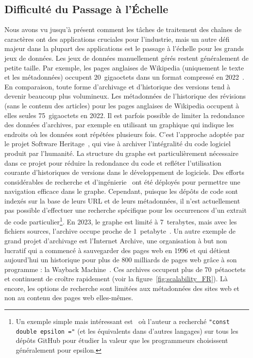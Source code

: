 \subsection*{Difficulté du Passage à l'Échelle}

Nous avons vu jusqu'à présent comment les tâches de traitement des chaînes de caractères ont des applications cruciales pour l'industrie, mais un autre défi majeur dans la plupart des applications est le passage à l'échelle pour les grands jeux de données.
Les jeux de données manuellement gérés restent généralement de petite taille. Par exemple, les pages anglaises de Wikipedia (uniquement le texte et les métadonnées) occupent 20~gigaoctets dans un format compressé en 2022~\cite{wikimedia}. En comparaison, toute forme d'archivage et d'historique des versions tend à devenir beaucoup plus volumineux. Les métadonnées de l'historique des révisions (sans le contenu des articles) pour les pages anglaises de Wikipedia occupent à elles seules 75~gigaoctets en 2022.
Il est parfois possible de limiter la redondance des données d'archives, par exemple en utilisant un graphique qui indique les endroits où les données sont répétées plusieurs fois. C'est l'approche adoptée par le projet Software Heritage~\cite{swh-site}, qui vise à archiver l'intégralité du code logiciel produit par l'humanité. La structure du graphe est particulièrement nécessaire dans ce projet pour réduire la redondance du code et refléter l'utilisation courante d'historiques de versions dans le développement de logiciels.
Des efforts considérables de recherche et d'ingénierie~\cite{DBLP:phd/hal/Pietri21} ont été déployés pour permettre une navigation efficace dans le graphe. 
Cependant, puisque les dépôts de code sont indexés sur la base de leurs URL et de leurs métadonnées, il n'est actuellement pas possible d'effectuer une recherche spécifique pour les occurrences d'un extrait de code particulier\footnote{\setlength\parindent{10pt} Un exemple simple mais intéressant est~\cite{vii2014if} où l'auteur a recherché \texttt{"const double epsilon ="} (et les équivalents dans d'autres langages) sur tous les dépôts GitHub pour étudier la valeur que les programmeurs choisissent généralement pour epsilon.}.
En 2023, le graphe est limité à 7~terabytes, mais avec les fichiers sources, l'archive occupe proche de 1~petabyte~\cite{swh-polytechnique}.
Un autre exemple de grand projet d'archivage est l'Internet Archive, une organisation à but non lucratif qui a commencé à sauvegarder des pages web en 1996 et qui détient aujourd'hui un historique pour plus de 800 milliards de pages web grâce à son programme : la Wayback Machine~\cite{web-archive}. Ces archives occupent plus de 70~pétaoctets et continuent de croître rapidement (voir la figure~\ref{fig:scalability_FR}).
Là encore, les options de recherche sont limitées aux métadonnées des sites web et non au contenu des pages web elles-mêmes.

